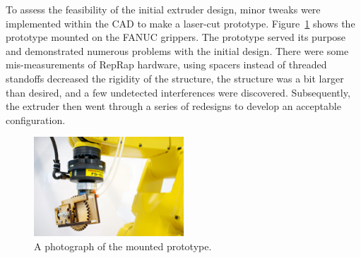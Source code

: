 To assess the feasibility of the initial extruder design, minor tweaks were implemented within the CAD to make a laser-cut prototype.  Figure~\ref{fig:prototype extruder} shows the prototype mounted on the FANUC grippers. The prototype served its purpose and demonstrated numerous problems with the initial design. There were some mis-measurements of RepRap hardware, using spacers instead of threaded standoffs decreased the rigidity of the structure, the structure was a bit larger than desired, and a few undetected interferences were discovered. Subsequently, the extruder then went through a series of redesigns to develop an acceptable configuration.\\

\begin{figure}[h!]
\centering
\includegraphics[width=0.5\textwidth]{./figures/extruder-prototype-2}
\caption{A photograph of the mounted prototype.}
\label{fig:prototype extruder}
\end{figure}

